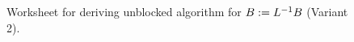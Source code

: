 \documentclass{article}
\begin{document}
\renewcommand{\update}{
$
  \begin{array}{l}
    b_{1}^T \becomes b_{1}^T / \lambda_{11} \\
    B_{2}   \becomes B_{2} - l_{21} b_{1}^T
  \end{array}
$
}


\begin{figure}[tbp]

\begin{center}     %
\footnotesize      %

\worksheet         %
\end{center}


\caption{ Worksheet for deriving unblocked algorithm for
$ B := L^{-1} B $ (Variant 2).}



\label{Trsm_llnn:annotated_unb_var2}

\end{figure}




\renewcommand{\partitionings}{
$ \ArgOne \rightarrow \PartArgOne $, and   %
$ \ArgTwo \rightarrow \PartArgTwo $        %
}

\end{document}
